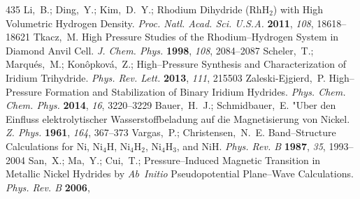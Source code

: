 \documentclass[12pt,letterpaper,oneside]{article}
\begin{document}
\begin{mcitethebibliography}{435}
Li,~B.; Ding,~Y.; Kim,~D.~Y.;   Rhodium
  Dihydride (RhH$_2$) with High Volumetric Hydrogen Density. \emph{Proc. Natl.
  Acad. Sci. U.S.A.} \textbf{2011}, \emph{108}, 18618--18621\relax
\mciteBstWouldAddEndPuncttrue
\mciteSetBstMidEndSepPunct{\mcitedefaultmidpunct}
{\mcitedefaultendpunct}{\mcitedefaultseppunct}\relax
\EndOfBibitem
{}
Tkacz,~M. High Pressure Studies of the Rhodium--Hydrogen System in Diamond
  Anvil Cell. \emph{J. Chem. Phys.} \textbf{1998}, \emph{108}, 2084--2087\relax
\mciteBstWouldAddEndPuncttrue
\mciteSetBstMidEndSepPunct{\mcitedefaultmidpunct}
{\mcitedefaultendpunct}{\mcitedefaultseppunct}\relax
\EndOfBibitem
{}
Scheler,~T.; Marqu{\'e}s,~M.; Kon{\^o}pkov{\'a},~Z.;   High--Pressure Synthesis and Characterization of
  Iridium Trihydride. \emph{Phys. Rev. Lett.} \textbf{2013}, \emph{111},
  215503\relax
\mciteBstWouldAddEndPuncttrue
\mciteSetBstMidEndSepPunct{\mcitedefaultmidpunct}
{\mcitedefaultendpunct}{\mcitedefaultseppunct}\relax
\EndOfBibitem
{}
Zaleski-Ejgierd,~P. High--Pressure Formation and Stabilization of Binary
  Iridium Hydrides. \emph{Phys. Chem. Chem. Phys.} \textbf{2014}, \emph{16},
  3220--3229\relax
\mciteBstWouldAddEndPuncttrue
\mciteSetBstMidEndSepPunct{\mcitedefaultmidpunct}
{\mcitedefaultendpunct}{\mcitedefaultseppunct}\relax
\EndOfBibitem
{}
Bauer,~H.~J.; Schmidbauer,~E. {"}Uber den Einfluss elektrolytischer
  Wasserstoffbeladung auf die Magnetisierung von Nickel. \emph{Z. Phys.}
  \textbf{1961}, \emph{164}, 367--373\relax
\mciteBstWouldAddEndPuncttrue
\mciteSetBstMidEndSepPunct{\mcitedefaultmidpunct}
{\mcitedefaultendpunct}{\mcitedefaultseppunct}\relax
\EndOfBibitem
{}
Vargas,~P.; Christensen,~N.~E. Band--Structure Calculations for Ni, Ni$_4$H,
  Ni$_4$H$_2$, Ni$_4$H$_3$, and NiH. \emph{Phys. Rev. B} \textbf{1987},
  \emph{35}, 1993--2004\relax
\mciteBstWouldAddEndPuncttrue
\mciteSetBstMidEndSepPunct{\mcitedefaultmidpunct}
{\mcitedefaultendpunct}{\mcitedefaultseppunct}\relax
\EndOfBibitem
{}
San,~X.; Ma,~Y.; Cui,~T.;   Pressure--Induced
  Magnetic Transition in Metallic Nickel Hydrides by \emph{Ab~Initio}
  Pseudopotential Plane--Wave Calculations. \emph{Phys. Rev. B} \textbf{2006},

\end{mcitethebibliography}
\end{document}
